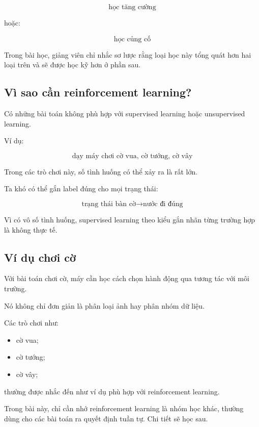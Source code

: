 \[
    \text{học tăng cường}
\]

hoặc:

\[
    \text{học củng cố}
\]

Trong bài học, giảng viên chỉ nhắc sơ lược rằng loại học này tổng quát hơn hai loại trên và sẽ được học kỹ hơn ở phần sau.

\subsection{Vì sao cần reinforcement learning?}

Có những bài toán không phù hợp với supervised learning hoặc unsupervised learning.

Ví dụ:

\[
    \text{dạy máy chơi cờ vua, cờ tướng, cờ vây}
\]

Trong các trò chơi này, số tình huống có thể xảy ra là rất lớn.

Ta khó có thể gắn label đúng cho mọi trạng thái:

\[
    \text{trạng thái bàn cờ}
    \rightarrow
    \text{nước đi đúng}
\]

Vì có vô số tình huống, supervised learning theo kiểu gắn nhãn từng trường hợp là không thực tế.

\subsection{Ví dụ chơi cờ}

Với bài toán chơi cờ, máy cần học cách chọn hành động qua tương tác với môi trường.

Nó không chỉ đơn giản là phân loại ảnh hay phân nhóm dữ liệu.

Các trò chơi như:

\begin{itemize}
    \item cờ vua;
    \item cờ tướng;
    \item cờ vây;
\end{itemize}

thường được nhắc đến như ví dụ phù hợp với reinforcement learning.

\begin{luuy}
Trong bài này, chỉ cần nhớ reinforcement learning là nhóm học khác, thường dùng cho các bài toán ra quyết định tuần tự. Chi tiết sẽ học sau.
\end{luuy}

